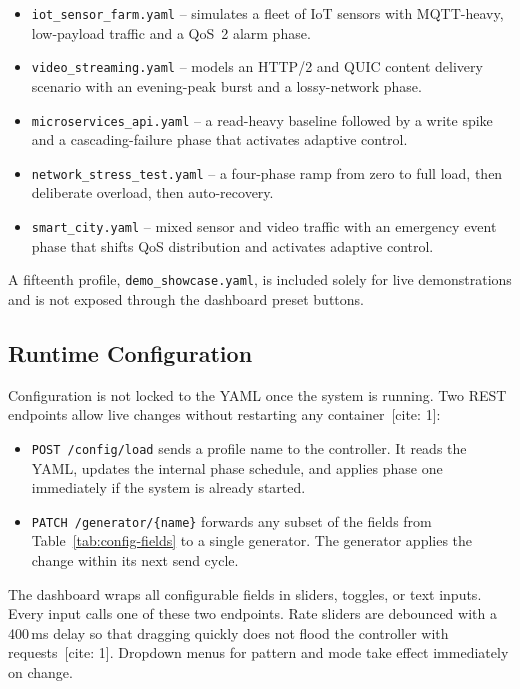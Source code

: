 \begin{itemize}
  \item \texttt{iot\_sensor\_farm.yaml} -- simulates a fleet of IoT sensors with
        MQTT-heavy, low-payload traffic and a QoS~2 alarm phase.
  \item \texttt{video\_streaming.yaml} -- models an HTTP/2 and QUIC content delivery
        scenario with an evening-peak burst and a lossy-network phase.
  \item \texttt{microservices\_api.yaml} -- a read-heavy baseline followed by a write
        spike and a cascading-failure phase that activates adaptive control.
  \item \texttt{network\_stress\_test.yaml} -- a four-phase ramp from zero to full load,
        then deliberate overload, then auto-recovery.
  \item \texttt{smart\_city.yaml} -- mixed sensor and video traffic with an emergency
        event phase that shifts QoS distribution and activates adaptive control.
\end{itemize}

\noindent A fifteenth profile, \texttt{demo\_showcase.yaml}, is included solely for
live demonstrations and is not exposed through the dashboard preset buttons.

\subsection{Runtime Configuration}

\noindent Configuration is not locked to the YAML once the system is running.
Two REST endpoints allow live changes without restarting any container~[cite: 1]:

\begin{itemize}
  \item \texttt{POST /config/load} sends a profile name to the controller.
        It reads the YAML, updates the internal phase schedule, and applies phase one
        immediately if the system is already started.
  \item \texttt{PATCH /generator/\{name\}} forwards any subset of the fields from
        Table~\ref{tab:config-fields} to a single generator.
        The generator applies the change within its next send cycle.
\end{itemize}

\noindent The dashboard wraps all configurable fields in sliders, toggles, or text inputs.
Every input calls one of these two endpoints.
Rate sliders are debounced with a 400\,ms delay so that dragging quickly does not
flood the controller with requests~[cite: 1].
Dropdown menus for pattern and mode take effect immediately on change.
